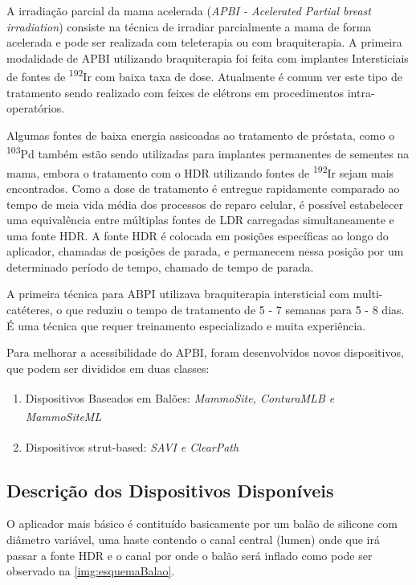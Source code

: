\documentclass[11pt,a4paper]{article}
\begin{document}
		A irradiação parcial da mama acelerada (\textit{APBI - Acelerated Partial breast irradiation}) consiste na técnica de irradiar parcialmente a mama de forma acelerada e pode ser realizada com teleterapia ou com braquiterapia. A primeira modalidade de APBI utilizando braquiterapia foi feita com implantes Intersticiais de fontes de \textsuperscript{192}Ir com baixa taxa de dose. Atualmente é comum ver este tipo de tratamento sendo realizado com feixes de elétrons em procedimentos intra-operatórios.

		Algumas fontes de baixa energia assicoadas ao tratamento de próstata, como o \textsuperscript{103}Pd também estão sendo utilizadas para implantes permanentes de sementes na mama, embora o tratamento com o HDR utilizando fontes de \textsuperscript{192}Ir sejam mais encontrados. Como a dose de tratamento é entregue rapidamente comparado ao tempo de meia vida média dos processos de reparo celular, é possível estabelecer uma equivalência entre múltiplas fontes de LDR carregadas simultaneamente e uma fonte HDR. A fonte HDR é colocada em posições específicas ao longo do aplicador, chamadas de posições de parada, e permanecem nessa posição por um determinado período de tempo, chamado de tempo de parada.

		A primeira técnica para ABPI utilizava braquiterapia intersticial com multi-catéteres, o que reduziu o tempo de tratamento de 5 - 7 semanas para 5 - 8 dias. É uma técnica que requer treinamento especializado e muita experiência.

		Para melhorar a acessibilidade do APBI, foram desenvolvidos novos dispositivos, que podem ser divididos em duas classes:

			\begin{enumerate}
				\item Dispositivos Baseados em Balões: \textit{MammoSite\textsuperscript{\textregistered}, ConturaMLB\textsuperscript{\textregistered} e MammoSiteML\textsuperscript{\textregistered}}
				\item Dispositivos strut-based: \textit{SAVI\textsuperscript{\textregistered} e ClearPath\textsuperscript{\textregistered}}
			\end{enumerate}
		
		\subsection*{Descrição dos Dispositivos Disponíveis}

			O aplicador mais básico é contituído basicamente por um balão de silicone com diâmetro variável, uma haste contendo o canal central (lumen) onde que irá passar a fonte HDR e o canal por onde o balão será inflado como pode ser observado na    \ref{img:esquemaBalao}.
\end{document}
